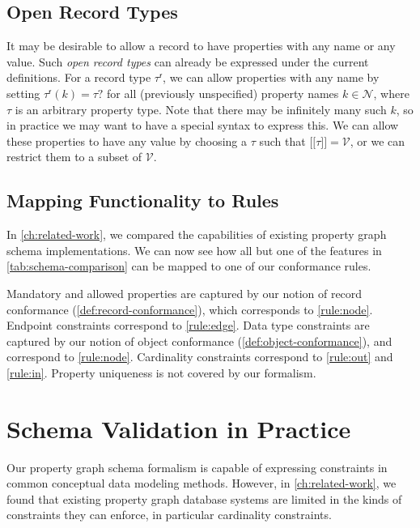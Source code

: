 \documentclass{report}
\theoremstyle{definition}
\newcommand{\ptype}{\tau}
\newcommand{\rtype}{\tau^\mathsf{r}}
\newcommand{\lsem}{\ensuremath{[\![}}
\newcommand{\rsem}{\ensuremath{]\!]}}
\newcommand{\sem}[1]{\ensuremath{\lsem #1 \rsem}}
\begin{document}
\section{Open Record Types}

It may be desirable to allow a record to have properties with any name or any value. Such \emph{open record types} can already be expressed under the current definitions. For a record type $\rtype$, we can allow properties with any name by setting $\rtype(k) = \ptype?$ for all (previously unspecified) property names $k \in \mathcal{N}$, where $\ptype$ is an arbitrary property type. Note that there may be infinitely many such $k$, so in practice we may want to have a special syntax to express this. We can allow these properties to have any value by choosing a $\ptype$ such that $\sem{\ptype} = \mathcal{V}$, or we can restrict them to a subset of $\mathcal{V}$.

\section{Mapping Functionality to Rules}

In \autoref{ch:related-work}, we compared the capabilities of existing property graph schema implementations. We can now see how all but one of the features in \autoref{tab:schema-comparison} can be mapped to one of our conformance rules.

Mandatory and allowed properties are captured by our notion of record conformance (\autoref{def:record-conformance}), which corresponds to \autoref{rule:node}. Endpoint constraints correspond to \autoref{rule:edge}. Data type constraints are captured by our notion of object conformance (\autoref{def:object-conformance}), and correspond to \autoref{rule:node}. Cardinality constraints correspond to \autoref{rule:out} and \ref{rule:in}. Property uniqueness is not covered by our formalism.

\chapter{Schema Validation in Practice}
\label{ch:practice}

Our property graph schema formalism is capable of expressing constraints in common conceptual data modeling methods. However, in \autoref{ch:related-work}, we found that existing property graph database systems are limited in the kinds of constraints they can enforce, in particular cardinality constraints.
\end{document}
